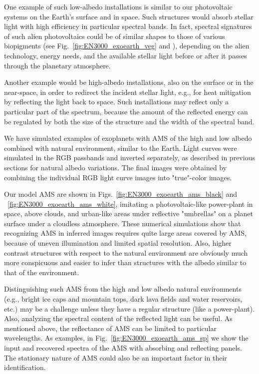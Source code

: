 \documentclass{emulateapj}
\begin{document}
One example of such low-albedo installations is similar to our photovoltaic systems 
on the Earth's surface and in space. 
Such structures would absorb stellar light with high efficiency 
in particular spectral bands.
In fact, spectral signatures of such alien photovoltaics 
could be of similar shapes to those of various biopigments 
(see Fig.~\ref{fig:EN3000_exoearth_veg} and \cite{berdetal2016}), 
depending on the alien technology, energy needs, and the available stellar light 
before or after it passes through the planetary atmosphere.

Another example would be high-albedo installations, also on the surface or in the near-space,
in order to redirect the incident stellar light, e.g., for heat mitigation 
by reflecting the light back to space.
Such installations may reflect only a particular part of the spectrum, 
because the amount of the reflected energy can be regulated by both the size 
of the structure and the width of the spectral band.

We have simulated examples of exoplanets with AMS of the high and low albedo
combined with natural environment, similar to the Earth. Light curves were simulated
in the RGB passbands and inverted separately, as described in previous sections 
for natural albedo variations. The final images were obtained
by combining the individual RGB light curve images into "true"-color images.

Our model AMS are shown in 
Figs.~\ref{fig:EN3000_exoearth_ams_black} and ~\ref{fig:EN3000_exoearth_ams_white},
imitating a photovoltaic-like power-plant in space, above clouds, 
and urban-like areas under reflective "umbrellas" on a planet surface 
under a cloudless atmosphere.
These numerical simulations show that recognizing AMS in inferred images 
requires quite large areas covered by AMS, because of uneven illumination 
and limited spatial resolution. 
Also, higher contrast structures with respect to the natural environment 
are obviously much more conspicuous and easier to infer than structures with the albedo
similar to that of the environment. 

Distinguishing such AMS from the high and low albedo natural environments 
(e.g., bright ice caps and mountain tops, dark lava fields and water reservoirs, etc.) 
may be a challenge unless they have a regular structure (like a power-plant).
Also, analyzing the spectral content of the reflected light can be useful. 
As mentioned above, the reflectance of AMS can be limited to particular wavelengths.
As examples, in Fig.~\ref{fig:EN3000_exoearth_ams_sp} we show the input and recovered 
spectra of the AMS with absorbing and reflecting panels. The stationary nature of AMS
could also be an important factor in their identification.
\end{document}
